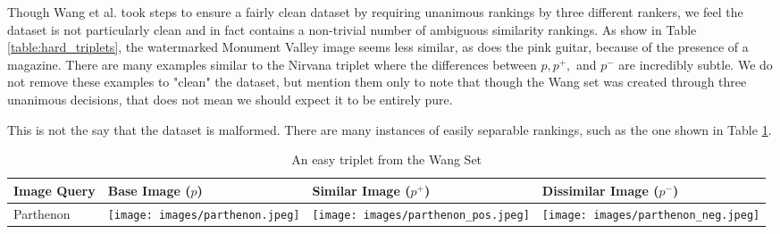 Though Wang et al. took steps to ensure a fairly clean dataset by requiring unanimous rankings by three different rankers, we feel the dataset is not particularly clean and in fact contains a non-trivial number of ambiguous similarity rankings. As show in Table \ref{table:hard_triplets}, the watermarked Monument Valley image seems less similar, as does the pink guitar, because of the presence of a magazine. There are many examples similar to the Nirvana triplet where the differences between $p, p^+,$ and $p^-$ are incredibly subtle. We do not remove these examples to "clean" the dataset, but mention them only to note that though the Wang set was created through three unanimous decisions, that does not mean we should expect it to be entirely pure.

This is not the say that the dataset is malformed. There are many instances of easily separable rankings, such as the one shown in Table \ref{table:easy_triplet}.
\begin{table}
	\begin{tabular}{>{\centering\arraybackslash}m{1in} >{\centering\arraybackslash}m{1.4in} >{\centering\arraybackslash}m{1.4in} >{\centering\arraybackslash}m{1.4in}}
		\toprule
		\bfseries Image Query & \bfseries Base Image ($p$) & \bfseries Similar Image ($p^+$) & \bfseries Dissimilar Image ($p^-$) \\
		\midrule
		\centering Parthenon & \texttt{[image: images/parthenon.jpeg]} & \texttt{[image: images/parthenon\_pos.jpeg]} & \texttt{[image: images/parthenon\_neg.jpeg]}\\
		\bottomrule
	\end{tabular}
	\caption{An easy triplet from the Wang Set}
	\label{table:easy_triplet}
\end{table}


